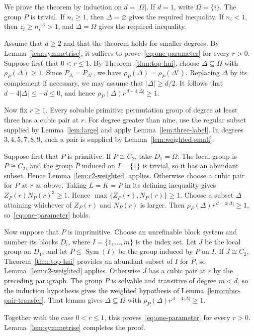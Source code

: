 \documentclass[10pt]{amsart}
\theoremstyle{definition}
\renewcommand{\le}{\leqslant}
\renewcommand{\ge}{\geqslant}
\renewcommand{\leq}{\leqslant}
\renewcommand{\geq}{\geqslant}
\let\oldendproof\endproof
\renewenvironment{proof}[1][\proofname]{%
  \oldproof[\bfseries #1]%
}{\oldendproof}
\DeclareMathOperator{\Sym}{Sym}
\numberwithin{equation}{section}
\numberwithin{table}{section}
\begin{document}
\begin{proof}[Proof of Theorem~\ref{thm:weighted}]
We prove the theorem by induction on $d=|\Omega|$. If $d=1$, write
$\Omega=\{i\}$. The group $P$ is trivial. If $n_i\ge1$, then
$\Delta=\varnothing$ gives the required inequality. If $n_i<1$, then
$z_i\ge n_i^{-3}>1$, and $\Delta=\Omega$ gives the required inequality.

Assume that $d\ge2$ and that the theorem holds for smaller degrees. By
Lemma~\ref{lem:symmetrise}, it suffices to prove~\eqref{eq:one-parameter} for
every $r>0$. Suppose first that $0<r\leq1$. By
Theorem~\ref{thm:top-hni}, choose $\Delta\subseteq\Omega$ with
$\rho_P(\Delta)\geq1$. Since
$P_\Delta=P_{\Delta^c}$, we have
$\rho_P(\Delta)=\rho_P(\Delta^c)$. Replacing $\Delta$ by its complement if
necessary, we may assume that $|\Delta|\ge d/2$. It follows that
$d-4|\Delta|\le-d\le0$, and hence
$\rho_P(\Delta)r^{\,d-4|\Delta|}\ge1$.

Now fix $r\ge1$. Every solvable primitive permutation group of degree at
least three has a cubic pair at $r$. For degree greater than nine, use the
regular subset supplied by Lemma~\ref{lem:large} and apply
Lemma~\ref{lem:three-label}. In degrees $3,4,5,7,8,9$, such a pair is
supplied by Lemma~\ref{lem:weighted-small}.

Suppose first that $P$ is primitive. If $P\cong C_2$, take
$D_1=\Omega$. The local group is $P\cong C_2$, and the group
$\overline P$ induced on $I=\{1\}$ is trivial, so it has an abundant subset.
Hence Lemma~\ref{lem:c2-weighted} applies. Otherwise choose a cubic pair
for $P$ at $r$ as above. Taking $L=K=P$ in its defining inequality gives
$Z_P(r)N_P(r)^3\ge1$. Hence
$\max\{Z_P(r),N_P(r)\}\ge1$. Choose a subset $\Delta$ attaining whichever
of $Z_P(r)$ and $N_P(r)$ is larger. Then
$\rho_P(\Delta)r^{\,d-4|\Delta|}\ge1$, so~\eqref{eq:one-parameter} holds.

Now suppose that $P$ is imprimitive. Choose an unrefinable block system and
number its blocks $D_i$, where $I=\{1,\ldots,m\}$ is the index set. Let $J$
be the local group on $D_1$, and let $\overline P\leq\Sym(I)$ be the group
induced by $P$ on $I$. If $J\cong C_2$,
Theorem~\ref{thm:top-hni} provides an abundant
subset of $I$ for $\overline P$, so Lemma~\ref{lem:c2-weighted} applies. Otherwise
$J$ has a cubic pair at $r$ by the preceding paragraph. The group
$\overline P$ is solvable and transitive of degree $m<d$, so the induction
hypothesis gives the weighted hypothesis of
Lemma~\ref{lem:cubic-pair-transfer}. That lemma gives
$\Delta\subseteq\Omega$ with
$\rho_P(\Delta)r^{\,d-4|\Delta|}\ge1$.

Together with the case $0<r\le1$, this proves~\eqref{eq:one-parameter} for
every $r>0$. Lemma~\ref{lem:symmetrise} completes the proof.
\end{proof}
\end{document}
